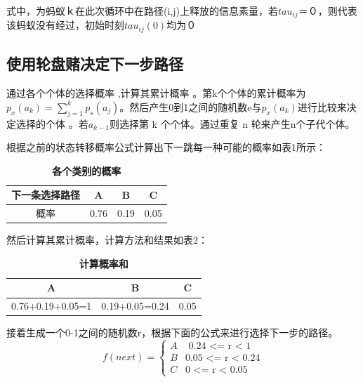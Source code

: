 \documentclass[10pt,a4paper,twocolumn,twoside,UTF8]{ctexart}
\begin{document}
式中，为蚂蚁ｋ在此次循环中在路径(i,j)上释放的信息素量，若$tau_{ij}$＝０，则代表该蚂蚁没有经过，初始时刻$tau_{ij}(0)$均为０

	\subsection{使用轮盘赌决定下一步路径}

通过各个个体的选择概率 ,计算其累计概率 。第k个个体的累计概率为$p_x(a_k) =  \sum\limits_{j=1}^k p_s(a_j)$。然后产生0到1之间的随机数e与$p_x(a_k)$进行比较来决定选择的个体 。若$a_{k-1}$则选择第 k 个个体。通过重复 n 轮来产生n个子代个体。

根据之前的状态转移概率公式计算出下一跳每一种可能的概率如表1所示：	
	 \begin{table}[H]
		\caption{\bf 各个类别的概率}
		\centering
		\begin{tabular}{|c|c|c|c| }%
		\hline  %
		下一条选择路径& A & B & C \\
		\hline  %
		概率& 0.76 & 0.19 & 0.05 \\
		\hline  %
		\end{tabular}
	\end{table}
		
然后计算其累计概率，计算方法和结果如表2：
	\begin{table}[H]
		\caption{\bf 计算概率和}
		\centering
		\begin{tabular}{|c|c|c| }%
		\hline  %
		A & B & C \\
		\hline  %
		0.76+0.19+0.05=1 & 0.19+0.05=0.24 & 0.05 \\
		\hline  %
		\end{tabular}
	\end{table}
接着生成一个0-1之间的随机数r，根据下面的公式来进行选择下一步的路径。
		\begin{equation}
			f(next) =
				\begin{cases}
				A& \text{ 0.24 <= r < 1 }\\
				B& \text{0.05 <= r < 0.24}  \\
				C& \text{0 <= r < 0.05}
				\end{cases}
		\end{equation}	
	

\end{document}
